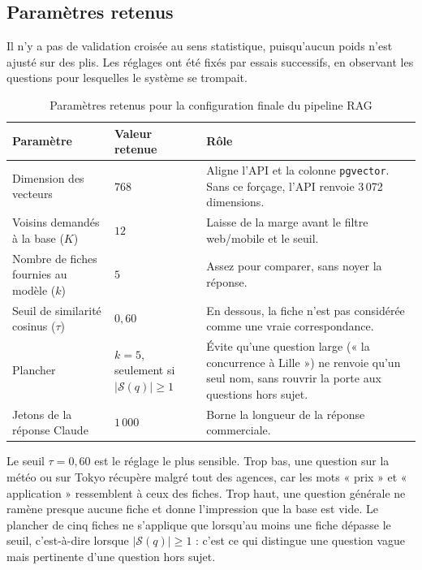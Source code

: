 \subsection{Paramètres retenus}

Il n'y a pas de validation croisée au sens statistique, puisqu'aucun poids n'est ajusté sur des plis. Les
réglages ont été fixés par essais successifs, en observant les questions pour lesquelles le système se
trompait.

\begin{table}[H]
\centering
\begingroup
{}
\small
\begin{tabularx}{\textwidth}{|p{4.2cm}|p{3.4cm}|X|}
\hline
\textbf{Paramètre} & \textbf{Valeur retenue} & \textbf{Rôle} \\
\hline
Dimension des vecteurs & $768$ & Aligne l'API et la colonne \texttt{pgvector}. Sans ce forçage, l'API renvoie
3\,072 dimensions. \\
\hline
Voisins demandés à la base ($K$) & $12$ & Laisse de la marge avant le filtre web/mobile et le seuil. \\
\hline
Nombre de fiches fournies au modèle ($k$) & $5$ & Assez pour comparer, sans noyer la réponse. \\
\hline
Seuil de similarité cosinus ($\tau$) & $0{,}60$ & En dessous, la fiche n'est pas considérée comme une vraie
correspondance. \\
\hline
Plancher & $k = 5$, seulement si $\lvert\mathcal{S}(q)\rvert \ge 1$ & Évite qu'une question large
(« la concurrence à Lille ») ne renvoie qu'un seul nom, sans rouvrir la porte aux questions hors sujet. \\
\hline
Jetons de la réponse Claude & $1\,000$ & Borne la longueur de la réponse commerciale. \\
\hline
\end{tabularx}
\endgroup
\caption{Paramètres retenus pour la configuration finale du pipeline RAG}
\label{tab:parametres}
\end{table}

Le seuil $\tau = 0{,}60$ est le réglage le plus sensible. Trop bas, une question sur la météo ou sur Tokyo
récupère malgré tout des agences, car les mots « prix » et « application » ressemblent à ceux des fiches.
Trop haut, une question générale ne ramène presque aucune fiche et donne l'impression que la base est vide.
Le plancher de cinq fiches ne s'applique que lorsqu'au moins une fiche dépasse le seuil, c'est-à-dire lorsque
$|\mathcal{S}(q)| \ge 1$ : c'est ce qui distingue une question vague mais pertinente d'une question hors sujet.

